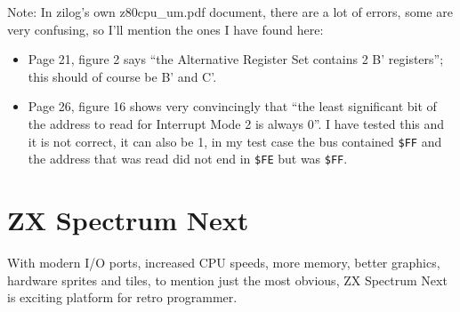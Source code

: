 \documentclass[12pt,twoside,openright,a4paper]{book}
\begin{document}
Note: In zilog's own z80cpu\_um.pdf document, there are a lot of errors, some are very confusing, so I'll mention the ones I have found here:

\begin{itemize}

	\item
	Page 21, figure 2 says ``the Alternative Register Set contains 2 B' registers''; this should of course be B' and C'.  

	\item
	Page 26, figure 16 shows very convincingly that ``the least significant bit of the address to read for Interrupt Mode 2 is always 0''. I have tested this and it is not correct, it can also be 1, in my test case the bus contained {\tt \$FF} and the address that was read did not end in {\tt \$FE} but was {\tt \$FF}.
  
\end{itemize}



\chapter{ZX Spectrum Next}



With modern I/O ports, increased CPU speeds, more memory, better graphics, hardware sprites and tiles, to mention just the most obvious, ZX Spectrum Next is exciting platform for retro programmer.

~ %
\end{document}
